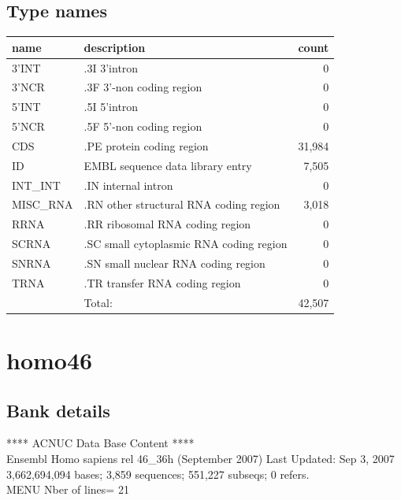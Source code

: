 \documentclass{article}
\begin{document}
\begin{Schunk}
\subsection{Type names}
\noindent\begin{tabular}{llr}
\hline \hline
name & description & count \\
\hline
3'INT  &  .3I 3'intron  &  0 \\
3'NCR  &  .3F  3'-non coding region  &  0 \\
5'INT  &  .5I 5'intron  &  0 \\
5'NCR  &  .5F  5'-non coding region  &  0 \\
CDS  &  .PE protein coding region  &  31,984 \\
ID  &  EMBL sequence data library entry  &  7,505 \\
INT\_INT  &  .IN  internal intron  &  0 \\
MISC\_RNA  &  .RN other structural RNA coding region  &  3,018 \\
RRNA  &  .RR ribosomal RNA coding region  &  0 \\
SCRNA  &  .SC small cytoplasmic RNA coding region  &  0 \\
SNRNA  &  .SN small nuclear RNA coding region  &  0 \\
TRNA  &  .TR transfer RNA coding region  &  0 \\
\hline
 & Total: & 42,507 \\
\hline \hline
\end{tabular}

\section{ homo46 }
\subsection{Bank details}
             ****     ACNUC Data Base Content      ****                         \\
    Ensembl Homo sapiens rel 46\_36h (September 2007) Last Updated: Sep  3, 2007\\
3,662,694,094 bases; 3,859 sequences; 551,227 subseqs; 0 refers.\\
MENU Nber of lines= 21                                                         


\end{Schunk}
\end{document}
